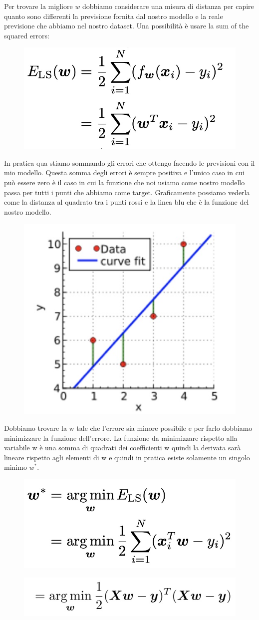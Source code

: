 \documentclass[14pt]{extreport}
\begin{document}
Per trovare la migliore $w$ dobbiamo considerare una misura di distanza per capire quanto sono differenti la previsione fornita dal nostro modello e
la reale previsione che abbiamo nel nostro dataset. Una possibilità è usare la sum of the squared errors:

\begin{figure}[H]
\centering
\includegraphics[width=0.4\linewidth]{65.jpeg}
\end{figure}

In pratica qua stiamo sommando gli errori che ottengo facendo le previsioni con il mio modello. Questa somma degli errori è sempre positiva e l'unico
caso in cui può essere zero è il caso in cui la funzione che noi usiamo come nostro modello passa per tutti i punti che abbiamo come target.
Graficamente possiamo vederla come la distanza al quadrato tra i punti rossi e la linea blu che è la funzione del nostro modello.

\begin{figure}[H]
\centering
\includegraphics[width=0.3\linewidth]{66.jpeg}
\end{figure}

Dobbiamo trovare la w tale che l'errore sia minore possibile e per farlo dobbiamo minimizzare la funzione dell'errore. La funzione da minimizzare
rispetto alla variabile w è una somma di quadrati dei coefficienti w quindi la derivata sarà lineare rispetto agli elementi di w e quindi in pratica
esiste solamente un singolo minimo $w^*$.
\begin{figure}[H]
\centering
\includegraphics[width=0.4\linewidth]{67.jpeg}
\end{figure}
\begin{figure}[H]
\centering
\includegraphics[width=0.4\linewidth]{68.jpeg}
\end{figure}
\end{document}

